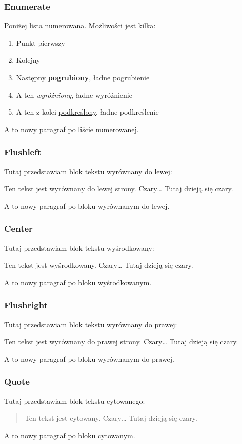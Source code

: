 \documentclass[10pt,a4paper]{article}
\begin{document}
\subsubsection{Enumerate}
Poniżej lista numerowana. Możliwości jest kilka:
\begin{enumerate}
\item Punkt pierwszy
\item Kolejny
\item Następny \textbf{pogrubiony}, ładne pogrubienie
\item A ten \emph{wyróżniony}, ładne wyróżnienie
\item A ten z kolei \underline{podkreślony}, ładne podkreślenie
\end{enumerate}
A to nowy paragraf po liście numerowanej.

\subsubsection{Flushleft}
Tutaj przedstawiam blok tekstu wyrównany do lewej:
\begin{flushleft}
Ten tekst jest wyrównany do lewej strony. Czary\ldots{} Tutaj dzieją się czary.
\end{flushleft}
A to nowy paragraf po bloku wyrównanym do lewej.

\subsubsection{Center}
Tutaj przedstawiam blok tekstu wyśrodkowany:
\begin{center}
Ten tekst jest wyśrodkowany. Czary\ldots{} Tutaj dzieją się czary.
\end{center}
A to nowy paragraf po bloku wyśrodkowanym.

\subsubsection{Flushright}
Tutaj przedstawiam blok tekstu wyrównany do prawej:
\begin{flushright}
Ten tekst jest wyrównany do prawej strony. Czary\ldots{} Tutaj dzieją się czary.
\end{flushright}
A to nowy paragraf po bloku wyrównanym do prawej.

\subsubsection{Quote}
Tutaj przedstawiam blok tekstu cytowanego:
\begin{quote}
Ten tekst jest cytowany. Czary\ldots{} Tutaj dzieją się czary.
\end{quote}
A to nowy paragraf po bloku cytowanym.
\end{document}
